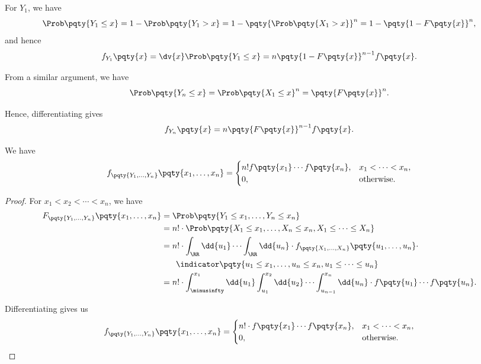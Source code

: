 \begin{example}
    \label{ex:density-y1-yn}%
    For \(Y_1\), we have
    \[
        \Prob\pqty{Y_1 \leq x} = 1 - \Prob\pqty{Y_1 > x} = 1 - \pqty{\Prob\pqty{X_1 > x}}^n = 1 - \pqty{1 - F\pqty{x}}^n,
    \]
    and hence
    \[
        f_{Y_1} \pqty{x} = \dv{x} \Prob\pqty{Y_1 \leq x} = n \pqty{1 - F\pqty{x}}^{n - 1} f\pqty{x}.
    \]

    From a similar argument, we have
    \[
        \Prob\pqty{Y_n \leq x} = \Prob\pqty{X_1 \leq x}^n = \pqty{F\pqty{x}}^n.
    \]

    Hence, differentiating gives
    \[
        f_{Y_n} \pqty{x} = n \pqty{F\pqty{x}}^{n - 1} f\pqty{x}.
\]
\end{example}

\begin{proposition}
    \label{prop:density-order-stats}%
    We have
    \[
        f_{\pqty{Y_1, \ldots, Y_n}} \pqty{x_1, \ldots, x_n} = \begin{cases}
            n! f\pqty{x_1} \cdots f\pqty{x_n}, & x_1 < \cdots < x_n, \\
            0, & \text{otherwise}.
        \end{cases}
    \]
\end{proposition}

\begin{proof}
    For \(x_1 < x_2 < \cdots < x_n\), we have
    \begin{align*}
        F_{\pqty{Y_1, \ldots, Y_n}} \pqty{x_1, \ldots, x_n} &= \Prob\pqty{Y_1 \leq x_1, \ldots, Y_n \leq x_n} \\
        &= n! \cdot \Prob\pqty{X_1 \leq x_1, \ldots, X_n \leq x_n, X_1 \leq \cdots \leq X_n} \\
        &= n! \cdot \int_{\RR} \dd{u_1} \cdots \int_{\RR} \dd{u_n} \cdot f_{\pqty{X_1, \ldots, X_n}} \pqty{u_1, \ldots, u_n} \cdot \\
        &\phantom{=} \quad \indicator \pqty{u_1 \leq x_1, \ldots, u_n \leq x_n, u_1 \leq \cdots \leq u_n} \\
        &= n! \cdot \int_{\minusinfty}^{x_1} \dd{u_1} \int_{u_1}^{x_2} \dd{u_2} \cdots \int_{u_{n - 1}}^{x_n} \dd{u_n} \cdot f\pqty{u_1} \cdots f\pqty{u_n}.
    \end{align*}

    Differentiating gives us
    \[
        f_{\pqty{Y_1, \ldots, Y_n}} \pqty{x_1, \ldots, x_n} = \begin{cases}
            n! \cdot f\pqty{x_1} \cdots f\pqty{x_n}, & x_1 < \cdots < x_n, \\
            0, & \text{otherwise}.
        \end{cases}
    \]
\end{proof}

